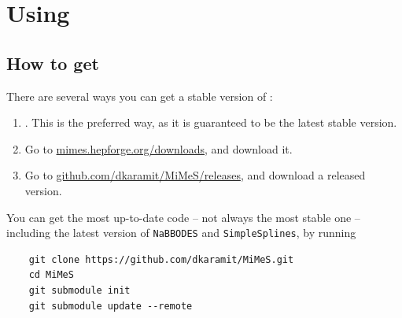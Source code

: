 \documentclass[10pt,utf8,compress,xcolor=dvipsnames]{beamer}
\begin{document}
%	
%	
%	
%	
%	


\section{Using \mimes}

\subsection{How to get \mimes}
\begin{frame}[fragile]{\insertsubsectionhead}
	There are several ways you can get a stable version of \mimes:
	\begin{enumerate}
		\item {}. This is the preferred way, as it is guaranteed to be the latest stable version.
		\item Go to \href{https://mimes.hepforge.org/downloads}{mimes.hepforge.org/downloads}, and download it. 
		\item Go to \href{https://github.com/dkaramit/MiMeS/releases}{github.com/dkaramit/MiMeS/releases}, and download a released version.    
	\end{enumerate}
	
	
	You can get the most up-to-date code -- not always the most stable one -- including the latest version of {\tt NaBBODES} and {\tt SimpleSplines}, by running
	\begin{lstlisting}
	git clone https://github.com/dkaramit/MiMeS.git
	cd MiMeS
	git submodule init
	git submodule update --remote
	\end{lstlisting}
	
\end{frame}
\end{document}
